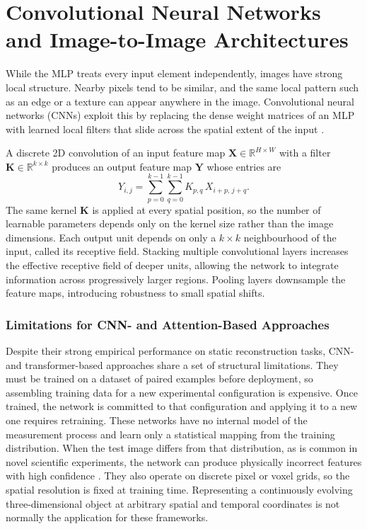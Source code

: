 \documentclass[12pt, a4paper, twoside]{report}
\begin{document}
\section{Convolutional Neural Networks and Image-to-Image Architectures}
\label{subsec:cnn}

While the MLP treats every input element independently, images have strong local structure. Nearby pixels tend to be similar, and the same local pattern such as an edge or a texture can appear anywhere in the image. Convolutional neural networks (CNNs) exploit this by replacing the dense weight matrices of an MLP with learned local filters that slide across the spatial extent of the input \citep{lecun1998gradient}.

A discrete 2D convolution of an input feature map $\mathbf{X} \in \mathbb{R}^{H \times W}$ with a filter $\mathbf{K} \in \mathbb{R}^{k \times k}$ produces an output feature map $\mathbf{Y}$ whose entries are
%
\begin{equation}
    Y_{i,j} = \sum_{p=0}^{k-1}\sum_{q=0}^{k-1} K_{p,q}\, X_{i+p,\, j+q}.
    \label{eq:conv2d}
\end{equation}
%
The same kernel $\mathbf{K}$ is applied at every spatial position, so the number of learnable parameters depends only on the kernel size rather than the image dimensions. Each output unit depends on only a $k \times k$ neighbourhood of the input, called its receptive field. Stacking multiple convolutional layers increases the effective receptive field of deeper units, allowing the network to integrate information across progressively larger regions. Pooling layers downsample the feature maps, introducing robustness to small spatial shifts.

\subsubsection*{Limitations for CNN- and Attention-Based Approaches}

Despite their strong empirical performance on static reconstruction tasks, CNN- and transformer-based approaches share a set of structural limitations. They must be trained on a dataset of paired examples before deployment, so assembling training data for a new experimental configuration is expensive. Once trained, the network is committed to that configuration and applying it to a new one requires retraining. These networks have no internal model of the measurement process and learn only a statistical mapping from the training distribution. When the test image differs from that distribution, as is common in novel scientific experiments, the network can produce physically incorrect features with high confidence \citep{patwari2023hallucination}. They also operate on discrete pixel or voxel grids, so the spatial resolution is fixed at training time. Representing a continuously evolving three-dimensional object at arbitrary spatial and temporal coordinates is not normally the application for these frameworks.
\end{document}
